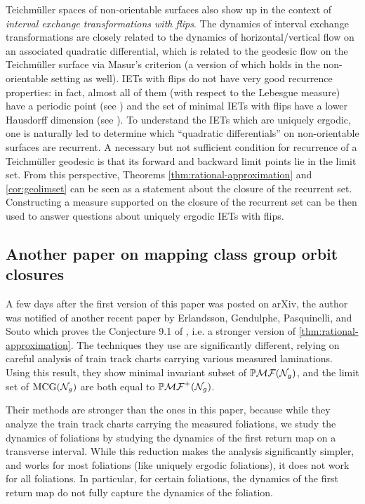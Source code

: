 Teichm\"uller spaces of non-orientable surfaces also show up in the context of \emph{interval exchange transformations with flips}.
The dynamics of interval exchange transformations are closely related to the dynamics of horizontal/vertical flow on an associated quadratic differential, which is related to the geodesic flow on the Teichm\"uller surface via Masur's criterion (a version of which holds in the non-orientable setting as well).
IETs with flips do not have very good recurrence properties: in fact, almost all of them (with respect to the Lebesgue measure) have a periodic point (see \cite{nogueira_1989}) and the set of minimal IETs with flips have a lower Hausdorff dimension (see \cite{skripchenko2018hausdorff}).
To understand the IETs which are uniquely ergodic, one is naturally led to determine which ``quadratic differentials'' on non-orientable surfaces are recurrent.
A necessary but not sufficient condition for recurrence of a Teichm\"uller geodesic is that its forward and backward limit points lie in the limit set.
From this perspective, Theorems \ref{thm:rational-approximation} and \ref{cor:geolimset} can
be seen as a statement about the closure of the recurrent set.
Constructing a measure supported on the closure of the recurrent set can be then used to answer questions about uniquely ergodic IETs with flips.

\subsection*{Another paper on mapping class group orbit closures}
A few days after the first version of this paper was posted on arXiv, the author was notified of another recent paper by Erlandsson, Gendulphe, Pasquinelli, and Souto \cite{erlandsson2023mapping} which proves the Conjecture 9.1 of \cite{gendulphe2017whats}, i.e. a stronger version of \autoref{thm:rational-approximation}.
The techniques they use are significantly different, relying on careful analysis of train track charts carrying various measured laminations.
Using this result, they show minimal invariant subset of $\mathbb{P}\mathcal{MF}(\mathcal{N}_g)$, and the limit set of $\mathrm{MCG}(\mathcal{N}_g)$ are both equal to $\mathbb{P}\mathcal{MF}^+(\mathcal{N}_g)$.

Their methods are stronger than the ones in this paper, because while they analyze the train track charts carrying the measured foliations, we study the dynamics of foliations by studying the dynamics of the first return map on a transverse interval.
While this reduction makes the analysis significantly simpler, and works for most foliations (like uniquely ergodic foliations), it does not work for all foliations.
In particular, for certain foliations, the dynamics of the first return map do not fully capture the dynamics of the foliation.


